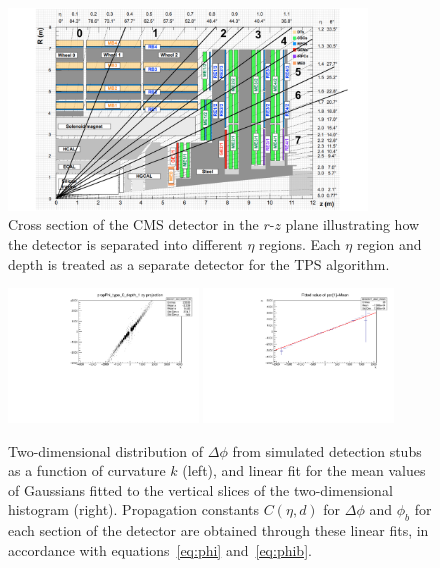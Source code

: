 \begin{figure}[htbp]
  \centering
  \includegraphics[width=0.85\textwidth]{fig/TPS/barrelEta.pdf}
  \caption{
    Cross section of the CMS detector in the $r$-$z$ plane illustrating how the detector is separated into different $\eta$ regions.
    Each $\eta$ region and depth is treated as a separate detector for the TPS algorithm.
  }
  \label{fig:barrelEta}
\end{figure}

\begin{figure}[htbp]
  \centering
  \includegraphics[width=0.45\textwidth]{fig/TPS/deltaPhi_2D.pdf}
  \includegraphics[width=0.45\textwidth]{fig/TPS/deltaPhi_mean.pdf}\\
  \caption{
    Two-dimensional distribution of $\Delta\phi$ from simulated detection stubs as a function of curvature $k$ (left), and linear fit for the mean values of Gaussians fitted to the vertical slices of the two-dimensional histogram (right).
    Propagation constants $C(\eta,d)$ for $\Delta\phi$ and $\phi_b$ for each section of the detector are obtained through these linear fits, in accordance with equations~\ref{eq:phi} and~\ref{eq:phib}.
  }
  \label{fig:deltaPhiHist}
\end{figure}

